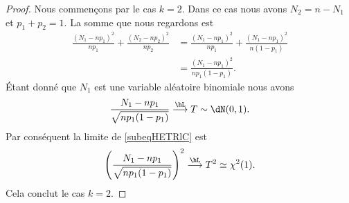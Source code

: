 \begin{proof}
	Nous commençons par le cas \( k=2\). Dans ce cas nous avons \( N_2=n-N_1\) et \( p_1+p_2=1\). La somme que nous regardons est
	\begin{subequations}
		\begin{align}
			\frac{ (N_1-np_1)^2 }{ np_1 }+\frac{ (N_2-np_2)^2 }{ np_2 } & =\frac{ (N_1-np_1)^2 }{ np_1 }+\frac{ (N_1-np_1)^2 }{ n(1-p_1) } \\
			                                                            & =\frac{ (N_1-np_1)^2 }{ np_1(1-p_1) }. \label{subeqHETRlC}
		\end{align}
	\end{subequations}
	Étant donné que \( N_1\) est une variable aléatoire binomiale nous avons
	\begin{equation}
		\frac{ N_1-np_1 }{ \sqrt{np_1(1-p_1)} }\stackrel{\hL}{\longrightarrow}T\sim\dN(0,1).
	\end{equation}
	Par conséquent la limite de \eqref{subeqHETRlC} est
	\begin{equation}
		\left( \frac{ N_1-np_1 }{ \sqrt{np_1(1-p_1)} } \right)^2\stackrel{\hL}{\longrightarrow}T^2\simeq\chi^2(1).
	\end{equation}
	Cela conclut le cas \( k=2\).


\end{proof}
